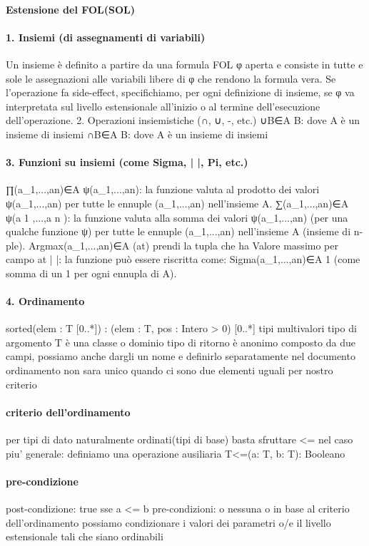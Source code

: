 \documentclass[12pt]{article}
\begin{document}
\paragraph{Estensione del FOL(SOL)}
\paragraph{1. Insiemi (di assegnamenti di variabili)}
	Un insieme è definito a partire da una formula FOL φ aperta e consiste in tutte e sole le assegnazioni alle variabili libere di φ che rendono la formula vera.
	Se l’operazione fa side-effect, specifichiamo, per ogni definizione di insieme, se φ va interpretata sul livello estensionale all’inizio o al termine dell’esecuzione dell’operazione.
2. Operazioni insiemistiche (∩, ∪, -, etc.)
	 ∪B∈A B: dove A è un insieme di insiemi
	 ∩B∈A B: dove A è un insieme di insiemi
\paragraph{3. Funzioni su insiemi (come Sigma, | |, Pi, etc.)}
	∏(a_1,...,an)∈A ψ(a_1,...,an): la funzione valuta al prodotto dei valori ψ(a_1,...,an) per tutte le ennuple (a_1,...,an) nell’insieme A.
	∑(a_1,...,an)∈A ψ(a 1 ,...,a n ): la funzione valuta alla somma dei valori ψ(a_1,...,an) (per una qualche funzione ψ) per tutte le ennuple (a_1,...,an) nell’insieme A (insieme di n-ple).
        Argmax(a_1,...,an)∈A  (at) prendi la tupla che ha Valore massimo per campo at
	| |: la funzione può essere riscritta come:  Sigma(a_1,...,an)∈A   1 (come somma di un 1 per ogni ennupla di A).
\paragraph{4. Ordinamento}
	sorted(elem : T [0..*]) : (elem : T, pos : Intero > 0) [0..*] 
		tipi multivalori
		tipo di argomento T è una classe o dominio
		tipo di ritorno è anonimo composto da due campi, possiamo anche dargli un nome e definirlo separatamente nel documento 
		ordinamento non sara unico quando ci sono due elementi uguali per nostro criterio
\paragraph{criterio dell'ordinamento}
			per tipi di dato naturalmente ordinati(tipi di base) basta sfruttare <=
			nel caso piu' generale: definiamo una operazione ausiliaria T<=(a: T, b: T): Booleano
\paragraph{pre-condizione}
				post-condizione: true sse a <= b
	pre-condizioni: o nessuna o in base al criterio dell'ordinamento possiamo condizionare i valori dei parametri o/e il livello estensionale tali che siano ordinabili
\end{document}
